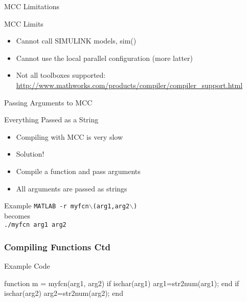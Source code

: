 \documentclass[handout]{beamer}
\begin{document}
   
   \begin{frame}{MCC Limitations}
    \begin{block}{MCC Limits}
     \begin{itemize}
     \item Cannot call SIMULINK models, sim()
     \item Cannot use the local parallel configuration (more latter)
     \item Not all toolboxes supported: \\
      \url{http://www.mathworks.com/products/compiler/compiler\_support.html}
     \end{itemize}
    \end{block}
   \end{frame}

   \begin{frame}{Passing Arguments to MCC}
    \begin{block}{Everything Passed as a String}
     \begin{itemize}
      \item Compiling with MCC is very slow
      \item <2->Solution!
      \item <3->Compile a function and pass arguments
      \item <3->All arguments are passed as strings
     \end{itemize}
    \end{block}
    \begin{block}{Example}
     \texttt{MATLAB -r myfcn$\backslash$(arg1,arg2$\backslash$)}
     \\ becomes \\
     \texttt{./myfcn arg1 arg2}
    \end{block}
   \end{frame}

\begin{frame}[fragile]
    \frametitle{Compiling Functions Ctd}
    \begin{block}{Example Code}
    \begin{semiverbatim}
	function m = myfcn(arg1, arg2)
	if ischar(arg1)
	   arg1=str2num(arg1);
	end
	if ischar(arg2)
	   arg2=str2num(arg2);
	end
    \end{semiverbatim}
    \end{block}
\end{frame}
\end{document}
